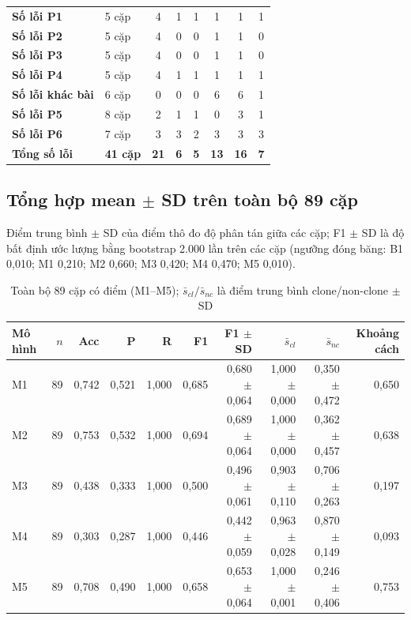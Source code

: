 \documentclass[11pt,a4paper]{article}
\begin{document}
{\begin{longtable}{llcccccc}
\textbf{Số lỗi P1}     & 5 cặp      & 4 & 1 & 1 & 1 & 1 & 1 \\
\textbf{Số lỗi P2}     & 5 cặp      & 4 & 0 & 0 & 1 & 1 & 0 \\
\textbf{Số lỗi P3}     & 5 cặp      & 4 & 0 & 0 & 1 & 1 & 0 \\
\textbf{Số lỗi P4}     & 5 cặp      & 4 & 1 & 1 & 1 & 1 & 1 \\
\textbf{Số lỗi khác bài} & 6 cặp    & 0 & 0 & 0 & 6 & 6 & 1 \\
\textbf{Số lỗi P5}     & 8 cặp      & 2 & 1 & 1 & 0 & 3 & 1 \\
\textbf{Số lỗi P6}     & 7 cặp      & 3 & 3 & 2 & 3 & 3 & 3 \\
\midrule
\textbf{Tổng số lỗi}   & \textbf{41 cặp} & \textbf{21} & \textbf{6} & \textbf{5} & \textbf{13} & \textbf{16} & \textbf{7} \\
\end{longtable}}

\subsection{Tổng hợp mean $\pm$ SD trên toàn bộ 89 cặp}
Điểm trung bình $\pm$ SD của điểm thô đo độ phân tán giữa các cặp; F1 $\pm$ SD
là độ bất định ước lượng bằng bootstrap 2.000 lần trên các cặp (ngưỡng đóng
băng: B1 0,010; M1 0,210; M2 0,660; M3 0,420; M4 0,470; M5 0,010).

\begin{table}[htbp]\centering\small
\caption{Toàn bộ 89 cặp có điểm (M1--M5); $\bar{s}_{cl}/\bar{s}_{nc}$ là điểm
trung bình clone/non-clone $\pm$ SD}\label{tab:suite-all}
\setlength{\tabcolsep}{3pt}
\begin{tabular}{lrrrrrrrrr}
\toprule
Mô hình & $n$ & Acc & P & R & F1 & F1 $\pm$ SD & $\bar{s}_{cl}$ & $\bar{s}_{nc}$ & Khoảng cách \\
\midrule
M1 & 89 & 0,742 & 0,521 & 1,000 & 0,685 & 0,680 $\pm$ 0,064 & 1,000 $\pm$ 0,000 & 0,350 $\pm$ 0,472 & 0,650 \\
M2 & 89 & 0,753 & 0,532 & 1,000 & 0,694 & 0,689 $\pm$ 0,064 & 1,000 $\pm$ 0,000 & 0,362 $\pm$ 0,457 & 0,638 \\
M3 & 89 & 0,438 & 0,333 & 1,000 & 0,500 & 0,496 $\pm$ 0,061 & 0,903 $\pm$ 0,110 & 0,706 $\pm$ 0,263 & 0,197 \\
M4 & 89 & 0,303 & 0,287 & 1,000 & 0,446 & 0,442 $\pm$ 0,059 & 0,963 $\pm$ 0,028 & 0,870 $\pm$ 0,149 & 0,093 \\
M5 & 89 & 0,708 & 0,490 & 1,000 & 0,658 & 0,653 $\pm$ 0,064 & 1,000 $\pm$ 0,001 & 0,246 $\pm$ 0,406 & 0,753 \\
\bottomrule
\end{tabular}
\end{table}
\end{document}
